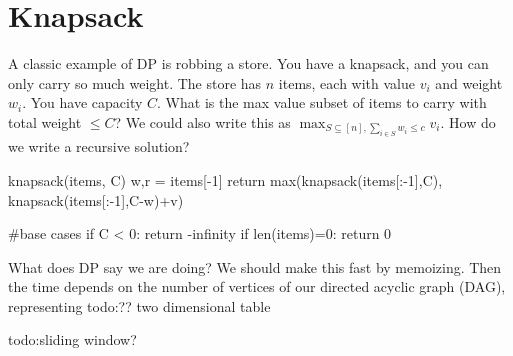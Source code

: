 \section{Knapsack} 
A classic example of DP is robbing a store. You have a knapsack, and you can only carry so much weight. The store has $n $ items, each with value $v_i $ and weight $w_i $. You have capacity $C$. What is the max value subset of items to carry with total weight $\leq C$? We could also write this as $\max _{S \subseteq [n], \sum _{i \in S}w_i  \leq c}v_i $. How do we write a recursive solution? 
\begin{python}
knapsack(items, C)
    w,r = items[-1]
    return max(knapsack(items[:-1],C),
    knapsack(items[:-1],C-w)+v)

#base cases
    if C < 0: return -infinity
    if len(items)=0: return 0
\end{python}
What does DP say we are doing? We should make this fast by memoizing. Then the time depends on the number of vertices of our directed acyclic graph (DAG), representing {\color{red}todo:?? two dimensional table} 

{\color{red}todo:sliding window?} 
